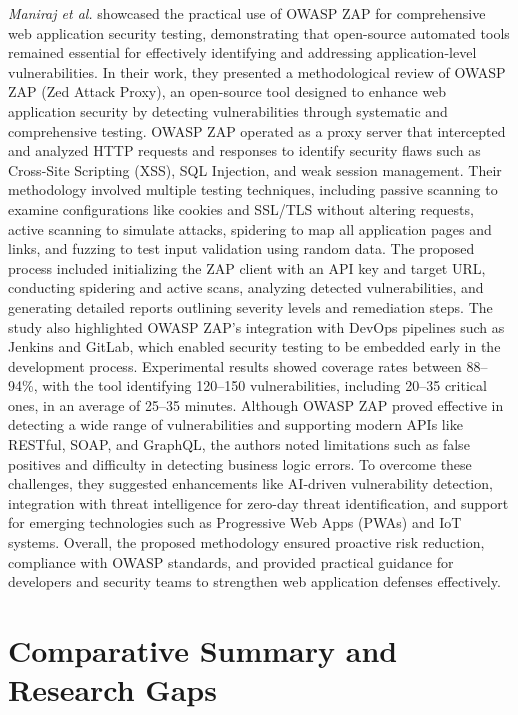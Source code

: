 \textit{Maniraj et al.} showcased the practical use of OWASP ZAP for comprehensive web application security testing, demonstrating that open-source automated tools remained essential for effectively identifying and addressing application-level vulnerabilities. In their work, they presented a methodological review of OWASP ZAP (Zed Attack Proxy), an open-source tool designed to enhance web application security by detecting vulnerabilities through systematic and comprehensive testing. OWASP ZAP operated as a proxy server that intercepted and analyzed HTTP requests and responses to identify security flaws such as Cross-Site Scripting (XSS), SQL Injection, and weak session management. Their methodology involved multiple testing techniques, including passive scanning to examine configurations like cookies and SSL/TLS without altering requests, active scanning to simulate attacks, spidering to map all application pages and links, and fuzzing to test input validation using random data. The proposed process included initializing the ZAP client with an API key and target URL, conducting spidering and active scans, analyzing detected vulnerabilities, and generating detailed reports outlining severity levels and remediation steps. The study also highlighted OWASP ZAP's integration with DevOps pipelines such as Jenkins and GitLab, which enabled security testing to be embedded early in the development process. Experimental results showed coverage rates between 88–94\%, with the tool identifying 120–150 vulnerabilities, including 20–35 critical ones, in an average of 25–35 minutes. Although OWASP ZAP proved effective in detecting a wide range of vulnerabilities and supporting modern APIs like RESTful, SOAP, and GraphQL, the authors noted limitations such as false positives and difficulty in detecting business logic errors. To overcome these challenges, they suggested enhancements like AI-driven vulnerability detection, integration with threat intelligence for zero-day threat identification, and support for emerging technologies such as Progressive Web Apps (PWAs) and IoT systems. Overall, the proposed methodology ensured proactive risk reduction, compliance with OWASP standards, and provided practical guidance for developers and security teams to strengthen web application defenses effectively. \cite{maniraj2024}

\section{Comparative Summary and Research Gaps}

